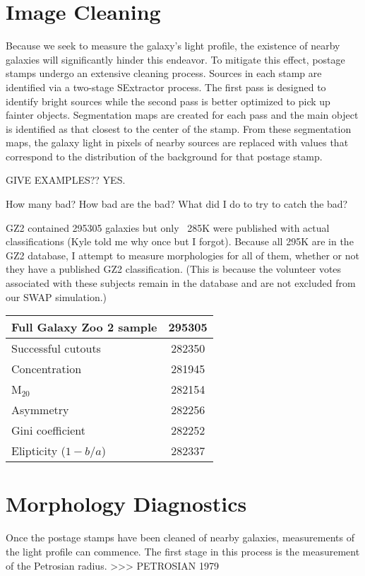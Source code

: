 \section{Image Cleaning}
Because we seek to measure the galaxy's light profile, the existence of nearby galaxies will significantly hinder this endeavor. To mitigate this effect, postage stamps undergo an extensive cleaning process. Sources in each stamp are identified via a two-stage SExtractor \citep[ver. 2.8.6;][]{sextractor} process. The first pass is designed to identify bright sources while the second pass is better optimized to pick up fainter objects. Segmentation maps are created for each pass and the main object is identified as that closest to the center of the stamp.  From these segmentation maps, the galaxy light in pixels of nearby sources are replaced with values that correspond to the distribution of the background for that postage stamp. 

 GIVE EXAMPLES??  YES. 

 How many bad? How bad are the bad? What did I do to try to catch the bad? 

GZ2 contained 295305 galaxies but only ~285K were published with actual classifications (Kyle told me why once but I forgot). Because all 295K are in the GZ2 database, I attempt to measure morphologies for all of them, whether or not they have a published GZ2 classification. (This is because the volunteer votes associated with these subjects remain in the database and are not excluded from our SWAP simulation.)

\begin{table}
	\begin{tabular}{|l|c|}
		\hline
		Full Galaxy Zoo 2 sample 	& 295305 \\
		\hline
		\hline
		Successful cutouts 			& 282350 \\
		Concentration				& 281945 \\
		M$_{20}$					& 282154 \\
		Asymmetry 					& 282256 \\
		Gini coefficient			& 282252 \\
		Elipticity ($1 - b/a$)		& 282337 \\
		\hline
	\end{tabular}
\end{table}

\section{Morphology Diagnostics}
Once the postage stamps have been cleaned of nearby galaxies, measurements of the light profile can commence. The first stage in this process is the measurement of the Petrosian radius. 
>>> PETROSIAN 1979

